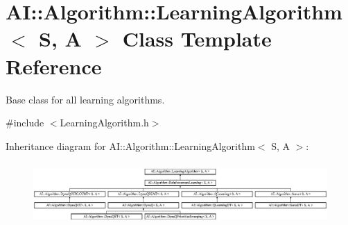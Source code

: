 \hypertarget{classAI_1_1Algorithm_1_1LearningAlgorithm}{\section{A\+I\+:\+:Algorithm\+:\+:Learning\+Algorithm$<$ S, A $>$ Class Template Reference}
\label{classAI_1_1Algorithm_1_1LearningAlgorithm}
}


Base class for all learning algorithms.  




{\ttfamily \#include $<$Learning\+Algorithm.\+h$>$}

Inheritance diagram for A\+I\+:\+:Algorithm\+:\+:Learning\+Algorithm$<$ S, A $>$\+:\begin{figure}[H]
\begin{center}
\leavevmode
\includegraphics[height=2.397260cm]{classAI_1_1Algorithm_1_1LearningAlgorithm}
\end{center}
\end{figure}
